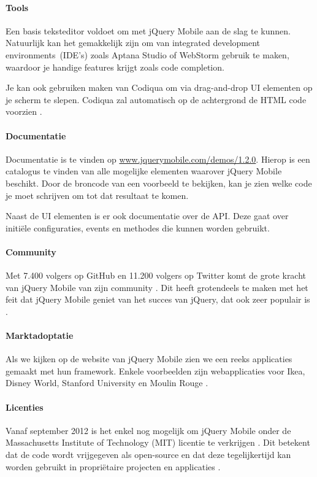 \paragraph{Tools}
Een basis teksteditor voldoet om met jQuery Mobile aan de slag te kunnen. Natuurlijk kan het gemakkelijk zijn om van integrated development environments~(IDE's) zoals Aptana Studio \cite{Aptana2012} of WebStorm \cite{JetBrains2012} gebruik te maken, waardoor je handige features krijgt zoals code completion.

Je kan ook gebruiken maken van Codiqua om via drag-and-drop UI elementen op je scherm te slepen. Codiqua zal automatisch op de achtergrond de HTML code voorzien \cite{Sperry2012}.

\paragraph{Documentatie}
Documentatie is te vinden op \url{www.jquerymobile.com/demos/1.2.0}. Hierop is een catalogus te vinden van alle mogelijke elementen waarover jQuery Mobile beschikt. Door de broncode van een voorbeeld te bekijken, kan je zien welke code je moet schrijven om tot dat resultaat te komen.

Naast de UI elementen is er ook documentatie over de API. Deze gaat over initiële configuraties, events en methodes die kunnen worden gebruikt.

\paragraph{Community}
Met 7.400 volgers op GitHub \cite{GitHub2012} en 11.200 volgers op Twitter \cite{Twitter2012} komt de grote kracht van jQuery Mobile van zijn community . Dit heeft grotendeels te maken met het feit dat jQuery Mobile geniet van het succes van jQuery, dat ook zeer populair is \cite{Hales2012}.

\paragraph{Marktadoptatie}
Als we kijken op de website van jQuery Mobile zien we een reeks applicaties gemaakt met hun framework. Enkele voorbeelden zijn webapplicaties voor Ikea, Disney World, Stanford University en Moulin Rouge \cite{JQuery2012a}. 

\paragraph{Licenties}
Vanaf september 2012 is het enkel nog mogelijk om jQuery Mobile onder de Massachusetts Institute of Technology (MIT) licentie te verkrijgen \cite{Dmethvin2012}. Dit betekent dat de code wordt vrijgegeven als open-source en dat deze tegelijkertijd kan worden gebruikt in propriëtaire projecten en applicaties \cite{PhilDutson2012}.

